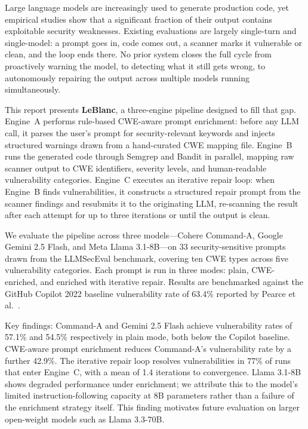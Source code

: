 \documentclass[12pt,a4paper]{report}
\begin{document}
\vspace{0.2in}
\noindent Large language models are increasingly used to generate production code,
yet empirical studies show that a significant fraction of their output contains
exploitable security weaknesses. Existing evaluations are largely single-turn and
single-model: a prompt goes in, code comes out, a scanner marks it vulnerable or
clean, and the loop ends there. No prior system closes the full cycle from
proactively warning the model, to detecting what it still gets wrong, to
autonomously repairing the output across multiple models running simultaneously.

\vspace{0.15in}
\noindent This report presents \textbf{LeBlanc}, a three-engine pipeline designed
to fill that gap. Engine~A performs rule-based CWE-aware prompt enrichment: before
any LLM call, it parses the user's prompt for security-relevant keywords and
injects structured warnings drawn from a hand-curated CWE mapping file.
Engine~B runs the generated code through Semgrep and Bandit in parallel, mapping
raw scanner output to CWE identifiers, severity levels, and human-readable
vulnerability categories. Engine~C executes an iterative repair loop: when
Engine~B finds vulnerabilities, it constructs a structured repair prompt from the
scanner findings and resubmits it to the originating LLM, re-scanning the result
after each attempt for up to three iterations or until the output is clean.

\vspace{0.15in}
\noindent We evaluate the pipeline across three models---Cohere Command-A,
Google Gemini 2.5 Flash, and Meta Llama 3.1-8B---on 33 security-sensitive prompts
drawn from the LLMSecEval benchmark, covering ten CWE types across five
vulnerability categories. Each prompt is run in three modes: plain, CWE-enriched,
and enriched with iterative repair. Results are benchmarked against the GitHub
Copilot 2022 baseline vulnerability rate of 63.4\% reported by Pearce et
al.~\cite{pearce2022asleep}.

\vspace{0.15in}
\noindent Key findings: Command-A and Gemini 2.5 Flash achieve vulnerability rates
of 57.1\% and 54.5\% respectively in plain mode, both below the Copilot baseline.
CWE-aware prompt enrichment reduces Command-A's vulnerability rate by a further
42.9\%. The iterative repair loop resolves vulnerabilities in 77\% of runs that
enter Engine~C, with a mean of 1.4 iterations to convergence. Llama 3.1-8B shows
degraded performance under enrichment; we attribute this to the model's limited
instruction-following capacity at 8B parameters rather than a failure of the
enrichment strategy itself. This finding motivates future evaluation on larger
open-weight models such as Llama 3.3-70B.
\end{document}
